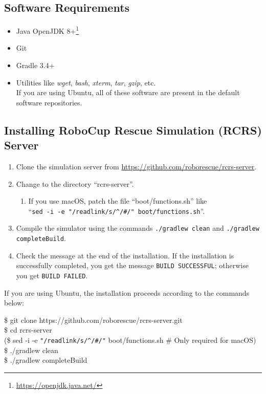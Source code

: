 \documentclass{article}
\begin{document}
\subsection{Software Requirements}
 \begin{itemize}
  \item Java OpenJDK 8+\footnote{\url{https://openjdk.java.net/}}
  \item Git
  \item Gradle 3.4+
  \item Utilities like \emph{wget}, \emph{bash}, \emph{xterm}, \emph{tar}, \emph{gzip}, etc.\\
        If you are using Ubuntu, all of these software are present in the
        default software repositories.
 \end{itemize}
\subsection{Installing RoboCup Rescue Simulation (RCRS) Server}
\begin{enumerate}
 \item Clone the simulation server from
       \url{https://github.com/roborescue/rcrs-server}.
 \item Change to the directory ``rcrs-server''.
       \begin{enumerate}
         \item If you use macOS, patch the file ``boot/functions.sh'' like\\
               ``\verb|sed -i -e "/readlink/s/^/#/" boot/functions.sh|''.
       \end{enumerate}
 \item Compile the simulator using the commands \texttt{./gradlew clean}
       and \texttt{./gradlew completeBuild}.
 \item Check the message at the end of the installation.
       If the installation is successfully completed, you get the message \texttt{BUILD SUCCESSFUL}; otherwise you get \texttt{BUILD FAILED}.
\end{enumerate}

If you are using Ubuntu, the installation proceeds according to the commands below:

\begin{center}
  \begin{tcolorbox}[title=Installation on Ubuntu, width=.98\linewidth]
  {\ttfamily\small
  \$ git clone https://github.com/roborescue/rcrs-server.git\\
   \$ cd rcrs-server\\
   (\$ sed -i -e \verb|"/readlink/s/^/#/"| boot/functions.sh \# Only required for macOS)\\
  \$ ./gradlew clean\\
  \$ ./gradlew completeBuild
  }
  \end{tcolorbox}
\end{center}
\end{document}
